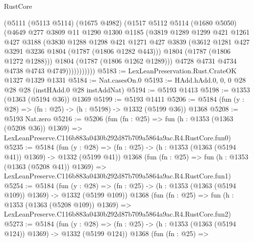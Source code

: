 \begin{lexlean}{RustCore}
\begin{coremodule}
                    (@5111
                      (@5113 @5114)
                      (@1675 @4982)
                      (@1517
                        @5112
                        @5114
                        (@1680 @5050)
                        (@4649
                          @277
                          @3809
                          @11
                          @1290
                          @1300
                          @1185
                          (@3819
                            @1289
                            @1299
                            @421
                            @1261
                            @427
                            @3188
                            (@3830
                              @1288
                              @1298
                              @421
                              @1271
                              @427
                              @3839
                              (@3612 @1281 @427 @3291 @3236 @1804 (@1787 (@1806 @1282 @443)))
                              @1804
                              (@1787 (@1806 @1272 @1288)))
                            @1804
                            (@1787 (@1806 @1262 @1289)))
                          @4728
                          @4731
                          @4734
                          @4738
                          @4743
                          @4749)))))))))))
@5183 := LexLeanPreservation.Rust.CrateOK @1327 @1329 @1331
@5184 := Nat.casesOn.{0}
@5193 := HAdd.hAdd.{0, 0, 0} @28 @28 @28 (instHAdd.{0} @28 instAddNat)
@5194 := @5193 @1413
@5198 := @1353 (@1363 (@5194 @36)) @1369
@5199 := @5193 @1411
@5206 := @5184 (fun (y : @28) => (fn : @25) -> (h : @5198) -> @1332 (@5199 @36)) @1368
@5208 := @5193 Nat.zero
@5216 := @5206
    (fun (fn : @25) =>
    fun (h : @1353 (@1363 (@5208 @36)) @1369) =>
    LexLeanPreserve.C116b883a0430b292d87b709a5864a9ac.R4.RustCore.fun0)
@5235 := @5184
    (fun (y : @28) => (fn : @25) -> (h : @1353 (@1363 (@5194 @41)) @1369) -> @1332 (@5199 @41))
    @1368
    (fun (fn : @25) =>
    fun (h : @1353 (@1363 (@5208 @41)) @1369) =>
    LexLeanPreserve.C116b883a0430b292d87b709a5864a9ac.R4.RustCore.fun1)
@5254 := @5184
    (fun (y : @28) => (fn : @25) -> (h : @1353 (@1363 (@5194 @109)) @1369) -> @1332 (@5199 @109))
    @1368
    (fun (fn : @25) =>
    fun (h : @1353 (@1363 (@5208 @109)) @1369) =>
    LexLeanPreserve.C116b883a0430b292d87b709a5864a9ac.R4.RustCore.fun2)
@5273 := @5184
    (fun (y : @28) => (fn : @25) -> (h : @1353 (@1363 (@5194 @124)) @1369) -> @1332 (@5199 @124))
    @1368
    (fun (fn : @25) =>

\end{coremodule}
\end{lexlean}
